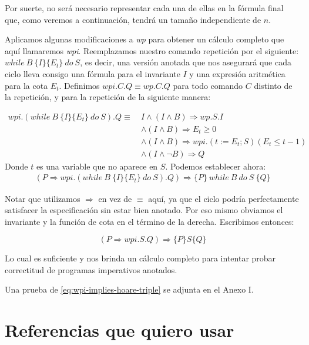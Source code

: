 \documentclass[12pt, a4paper, openany, fleqn]{book}
\begin{document}
    Por suerte, no será necesario representar cada una de ellas en la fórmula final que, como veremos a continuación, tendrá un tamaño independiente de $n$.

    Aplicamos algunas modificaciones a \textit{wp} para obtener un cálculo completo que aquí llamaremos \textit{wpi}.
    Reemplazamos nuestro comando repetición por el siguiente: $while\ B\ \{I\}\{E_t\}\ do\ S$, es decir, una versión anotada que nos asegurará que cada ciclo lleva consigo una fórmula para el invariante $I$ y una expresión aritmética para la cota $E_t$. Definimos $wpi.C.Q \equiv wp.C.Q$ para todo comando $C$ distinto de la repetición, y para la repetición de la siguiente manera:

    \begin{align*}
        wpi.(while\ B\ \{I\}\{E_t\}\ do\ S).Q \equiv\ & I \land (I \land B) \Rightarrow wp.S.I \\
            & \land (I \land B) \Rightarrow E_t \geqslant 0 \\
            & \land (I \land B) \Rightarrow wpi.(t := E_t; S)(E_t \leqslant t-1) \\
            & \land (I \land \lnot B) \Rightarrow Q
    \end{align*}
    Donde $t$ es una variable que no aparece en $S$.
    Podemos establecer ahora:
    \begin{align*}
        (P \Rightarrow wpi.(while\ B\ \{I\}\{E_t\}\ do\ S).Q) \Rightarrow \{P\}\ while\ B\ do\ S\ \{Q\}
    \end{align*}

    Notar que utilizamos $\Rightarrow$ en vez de $\equiv$ aquí, ya que el ciclo podría perfectamente satisfacer la especificación sin estar bien anotado. Por eso mismo obviamos el invariante y la función de cota en el término de la derecha. Escribimos entonces:

    \begin{equation}
        \label{eq:wpi-implies-hoare-triple}
        (P \Rightarrow wpi.S.Q) \Rightarrow \{P\}S\{Q\}
    \end{equation}

    Lo cual es suficiente y nos brinda un cálculo completo para intentar probar correctitud de programas imperativos anotados.

    Una prueba de \eqref{eq:wpi-implies-hoare-triple} se adjunta en el Anexo I.

    \section{Referencias que quiero usar}
\end{document}
